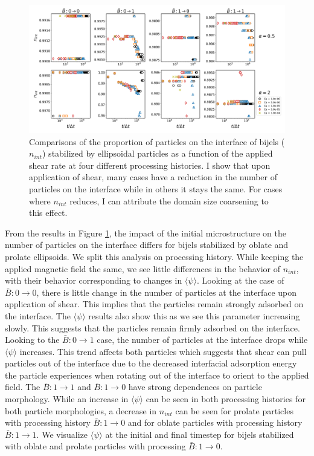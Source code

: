 \begin{figure} 
    \centering 
    \includegraphics[scale=0.3]{../figures/results/paper3/n_int-time_compare.png} 
    \caption{Comparisons of the proportion of particles on the interface of bijels ($n_{int}$) stabilized by ellipsoidal particles as a function of 
             the applied shear rate at four different processing histories. I show that upon application of shear, many cases have a 
             reduction in the number of particles on the interface while in others it stays the same. For cases where $n_{int}$ reduces, I can 
             attribute the domain size coarsening to this effect.} 
    \label{fig:particles_interface_prop_shear} 
\end{figure}

From the results in Figure \ref{fig:particles_interface_prop_shear}, the impact of the initial microstructure on the number of particles on the interface
differs for bijels stabilized by oblate and prolate ellipsoids. We split this analysis on processing history. While keeping the applied magnetic field
the same, we see little differences in the behavior of $n_{int}$, with their behavior corresponding to changes in $\langle \psi \rangle$. 
Looking at the case of $\bar{B}:0 \rightarrow 0$, there is little change in the number of particles at the interface upon application of shear. This implies that the 
particles remain strongly adsorbed on the
interface. The $\langle \psi \rangle$ results also show this as we see this parameter increasing slowly. This suggests that the particles remain firmly adsorbed
on the interface. Looking to the $\bar{B}:0 \rightarrow 1$ case, the number of particles at the interface drops while $\langle \psi \rangle$ increases. This
trend affects both particles which suggests that shear can pull particles out of the interface due to the decreased
interfacial adsorption energy the particle experiences when rotating out of the interface to orient to the applied field. The $\bar{B}:1 \rightarrow 1$ and 
$\bar{B}:1 \rightarrow 0$ have strong dependences on particle morphology. While an increase in $\langle \psi \rangle$ can be seen in both processing histories 
for both particle morphologies, a decrease in $n_{int}$ can be seen for prolate particles with processing history $\bar{B}:1 \rightarrow 0$ and for 
oblate particles with processing history $\bar{B}:1 \rightarrow 1$. We visualize $\langle \psi \rangle$ at the initial and final timestep for bijels stabilized with
oblate and prolate particles with processing $\bar{B}:1 \rightarrow 0$.

